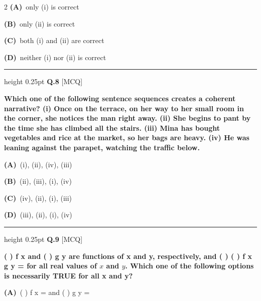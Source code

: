 \documentclass[a4paper,10pt,twoside]{article}
\begin{document}
\begin{multicols}{2}
\textbf{(A)}~only (i) is correct\par\vspace{2pt}\noindent
\textbf{(B)}~only (ii) is correct\par\vspace{2pt}\noindent
\textbf{(C)}~both (i) and (ii) are correct\par\vspace{2pt}\noindent
\textbf{(D)}~neither (i) nor (ii) is correct
\par\vspace{6pt}\hrule height 0.25pt\vspace{6pt}
\noindent\textbf{Q.8} \hfill {\footnotesize\textsf{[MCQ]}}
\par\vspace{2pt}
{\bfseries Which one of the following sentence sequences creates a coherent narrative?
(i)
Once on the terrace, on her way to her small room in the corner, she
notices the man right away.
(ii)
She begins to pant by the time she has climbed all the stairs.
(iii)
Mina has bought vegetables and rice at the market, so her bags are
heavy.
(iv)
He was leaning against the parapet, watching the traffic below. \par}
\par\vspace{2pt}\noindent
\textbf{(A)}~(i), (ii), (iv), (iii)\par\vspace{2pt}\noindent
\textbf{(B)}~(ii), (iii), (i), (iv)\par\vspace{2pt}\noindent
\textbf{(C)}~(iv), (ii), (i), (iii)\par\vspace{2pt}\noindent
\textbf{(D)}~(iii), (ii), (i), (iv)
\par\vspace{6pt}\hrule height 0.25pt\vspace{6pt}
\noindent\textbf{Q.9} \hfill {\footnotesize\textsf{[MCQ]}}
\par\vspace{2pt}
{\bfseries ( )
f x and ( )
g y are functions of x and y, respectively, and
( )
( )
f x
g y
=
for all real
values of $x$ and $y$. Which one of the following options is necessarily TRUE for all
x and y? \par}
\par\vspace{2pt}\noindent
\textbf{(A)}~( )  \newline f x = \newline and ( )  \newline g y =\par\vspace{2pt}\noindent

\end{multicols}
\end{document}
